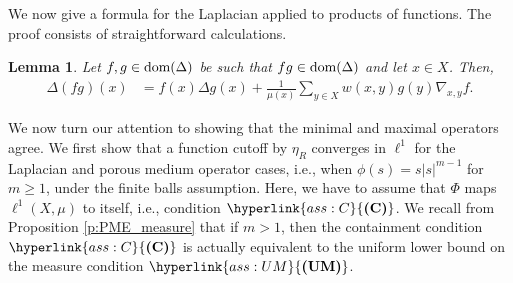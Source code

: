 \documentclass[letterpaper]{article}
\newtheorem{lemma}{Lemma}[section]
\theoremstyle{definition}
\theoremstyle{named}
\numberwithin{equation}{section}
\newcommand{\UM}{\hyperlink{ass:UM}{\textup{\textbf{(UM)}}}}
\newcommand{\C}{\hyperlink{ass:C}{\textup{\textbf{(C)}}}}
\newcommand{\dom}{\textnormal{dom}} %
\begin{document}
We now give a formula for
the Laplacian applied to products
of functions. The proof consists of straightforward calculations. 

\begin{lemma}\label{l:product}
Let $f, g \in \dom (\Delta)$ be such that $fg \in \dom (\Delta)$ and let $x \in X$. Then,
\begin{align*}
\Delta(fg)(x) &= f(x) \Delta g(x) + \frac{1}{\mu(x)}
\sum_{y \in X} w(x,y) g(y) \nabla_{x,y}f.
\end{align*}
\end{lemma}

We now turn our attention to showing that the minimal and maximal operators
agree.
We first show that a function cutoff by $\eta_R$ converges in $\ell^1$ for the Laplacian and 
porous medium operator cases, i.e., when $\phi(s) = s |s|^{m-1}$ for $m\geq1$,
under the finite balls assumption.
Here, we have to assume that $\Phi$ maps $\ell^1(X,\mu)$ to itself, i.e., 
condition $\C$. We recall from Proposition \ref{p:PME_measure} that if $m>1$, then the containment condition
$\C$ is actually equivalent to the uniform lower bound on the measure
condition $\UM$.
\end{document}
